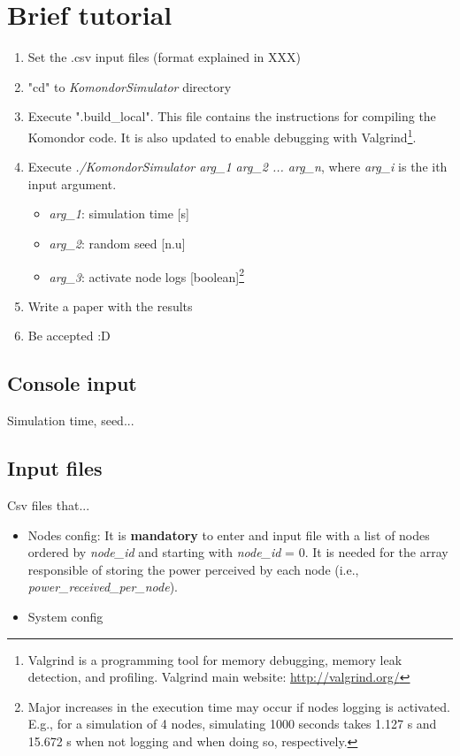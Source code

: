 \documentclass[a4paper]{article}
\begin{document}
\section{Brief tutorial}
\begin{enumerate}
	\item Set the .csv input files (format explained in XXX)
	\item "cd" to \textit{KomondorSimulator} directory
    \item Execute ".build\_local". This file contains the instructions for compiling the Komondor code. It is also updated to enable debugging with Valgrind\footnote{Valgrind is a programming tool for memory debugging, memory leak detection, and profiling. Valgrind main website: \url{http://valgrind.org/}}.
    \item Execute \textit{./KomondorSimulator arg\_1 arg\_2 ... arg\_n}, where \textit{arg\_i} is the ith input argument.
    	\begin{itemize}
    		\item \textit{arg\_1}: simulation time [s]
    		\item \textit{arg\_2}: random seed [n.u]
            \item \textit{arg\_3}: activate node logs [boolean]\footnote{Major increases in the execution time may occur if nodes logging is activated. E.g., for a simulation of 4 nodes, simulating 1000 seconds takes 1.127 s and 15.672 s when not logging and when doing so, respectively.}
		\end{itemize}
    \item Write a paper with the results
    \item Be accepted :D
\end{enumerate}


\subsection{Console input}
Simulation time, seed...
\subsection{Input files}
Csv files that...
\begin{itemize}
  \item Nodes config: It is \textbf{mandatory} to enter and input file with a list of nodes ordered by \textit{node\_id} and starting with \textit{node\_id} = 0. It is needed for the array responsible of storing the power perceived by each node (i.e., \textit{power\_received\_per\_node}).
  \item System config
\end{itemize}
\end{document}
